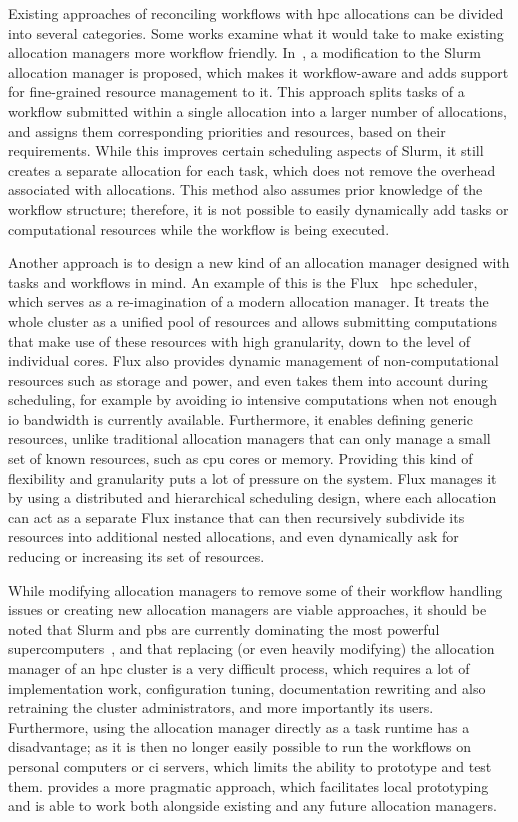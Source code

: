 Existing approaches of reconciling workflows with \gls{hpc} allocations can be
divided into several categories. Some works examine what it would take to make existing allocation
managers more workflow friendly. In~\cite{slurm-workflow}, a modification to the Slurm allocation
manager is proposed, which makes it workflow-aware and adds support for fine-grained resource
management to it. This approach splits tasks of a workflow submitted within a single allocation
into a larger number of allocations, and assigns them corresponding priorities and resources, based
on their requirements. While this improves certain scheduling aspects of Slurm, it still creates a
separate allocation for each task, which does not remove the overhead associated with allocations.
This method also assumes prior knowledge of the workflow structure; therefore, it is not possible
to easily dynamically add tasks or computational resources while the workflow is being executed.

Another approach is to design a new kind of an allocation manager designed with tasks and workflows
in mind. An example of this is the Flux~\cite{flux} \gls{hpc} scheduler,
which serves as a re-imagination of a modern allocation manager. It treats the whole cluster as a
unified pool of resources and allows submitting computations that make use of these resources with
high granularity, down to the level of individual cores. Flux also provides dynamic management of
non-computational resources such as storage and power, and even takes them into account during
scheduling, for example by avoiding \gls{io} intensive computations when not enough
\gls{io} bandwidth is currently available. Furthermore, it enables defining generic
resources, unlike traditional allocation managers that can only manage a small set of known
resources, such as \gls{cpu} cores or memory. Providing this kind of flexibility and
granularity puts a lot of pressure on the system. Flux manages it by using a distributed and
hierarchical scheduling design, where each allocation can act as a separate Flux instance that can
then recursively subdivide its resources into additional nested allocations, and even dynamically
ask for reducing or increasing its set of resources.

While modifying allocation managers to remove some of their workflow handling issues or creating
new allocation managers are viable approaches, it should be noted that Slurm and
\gls{pbs} are currently dominating the most powerful
supercomputers~\cite{slurm-schedmd}, and that replacing (or even heavily modifying) the
allocation manager of an \gls{hpc} cluster is a very difficult process, which
requires a lot of implementation work, configuration tuning, documentation rewriting and also
retraining the cluster administrators, and more importantly its users. Furthermore, using the
allocation manager directly as a task runtime has a disadvantage; as it is then no longer easily
possible to run the workflows on personal computers or \gls{ci} servers, which
limits the ability to prototype and test them. \hyperqueue{} provides a more pragmatic
approach, which facilitates local prototyping and is able to work both alongside existing and any
future allocation managers.

